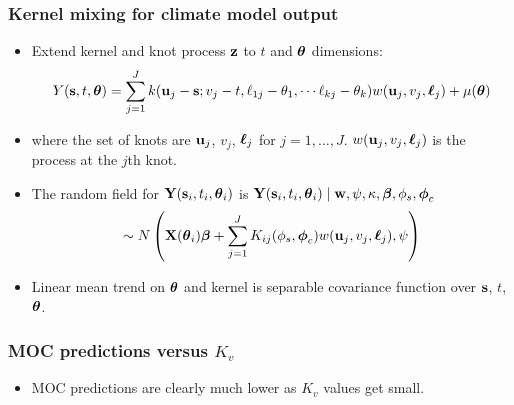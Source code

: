\documentclass{beamer}
\begin{document}
\begin{frame}
  \frametitle{Kernel mixing for climate model output}
    \begin{itemize}
\item Extend kernel and knot process ${\bf z}$ to $t$ and $\mbox{\boldmath $\theta$}$ dimensions:
$$  Y({\bf s},t,\mbox{\boldmath $\theta$})=\sum_{j=1}^J k({\bf u}_j-{\bf s};v_j-t,\ell_{1j}-\theta_1,\cdots \ell_{kj}-\theta_k) w({\bf u}_j,v_j,\mbox{\boldmath $\ell$}_j) + \mu(\mbox{\boldmath $\theta$}) $$
\item where the set of knots are ${\bf u}_j$, $v_j$, $\mbox{\boldmath $\ell$}_j$ for $j=1,\dots,J$. $w({\bf u}_j,v_j,\mbox{\boldmath $\ell$}_j)$ is the
process at the $j$th knot.  
\item The random field for  ${\bf Y} ({\bf s}_i,t_i,\mbox{\boldmath $\theta$}_i)$ is ${\bf Y} ({\bf s}_i,t_i,\mbox{\boldmath $\theta$}_i) \mid  {\bf w},\psi,\kappa,\mbox{\boldmath $\beta$},\phi_s,\mbox{\boldmath $\phi$}_c$ 
  \begin{equation*}\label{eq:riskmodel}
  \sim N\left({\bf X}(\mbox{\boldmath $\theta$}_i) \mbox{\boldmath $\beta$} + \sum_{j=1}^J K_{ij}(\phi_s,\mbox{\boldmath $\phi$}_c) w({\bf u}_j,v_j,\mbox{\boldmath $\ell$}_j), \psi \right) 
\end{equation*}  
\item Linear mean trend on $\mbox{\boldmath $\theta$}$ and kernel is separable covariance function over ${\bf s}$, $t$, $\mbox{\boldmath $\theta$}$. 

\end{itemize}
\end{frame}

\begin{frame}
\frametitle{MOC predictions versus $K_v$}
    \begin{itemize}
\item MOC predictions are clearly much lower as $K_v$ values get small.
\end{itemize}
\end{frame}
\end{document}
